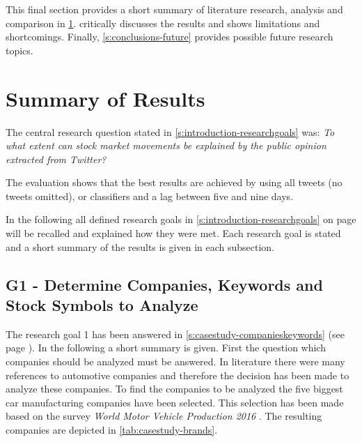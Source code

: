 This final section provides a short summary of literature research, analysis and comparison in \cref{s:conclusions-summary}.
 critically discusses the results and shows limitations and shortcomings. 
Finally, \cref{s:conclusions-future} provides possible future research topics.

\section{Summary of Results}
\label{s:conclusions-summary}

The central research question stated in \cref{s:introduction-researchgoals} was: \emph{To what extent can stock market movements be explained by the public opinion extracted from Twitter?}

The evaluation shows that the best results are achieved by using all tweets (no tweets omitted), \svm{} or \nb{} classifiers and a lag between five and nine days.

In the following all defined research goals in \cref{s:introduction-researchgoals} on page \pageref{s:introduction-researchgoals} will be recalled and explained how they were met.
Each research goal is stated and a short summary of the results is given in each subsection.


\subsection{G1 - Determine Companies, Keywords and Stock Symbols to Analyze}
\label{ss:conclusion-summary-g1}


The research goal 1 has been answered in \cref{s:casestudy-companieskeywords} (see page \pageref{s:casestudy-companieskeywords}).
In the following a short summary is given.
First the question which companies should be analyzed must be answered.
In literature there were many references to automotive companies and therefore the decision has been made to analyze these companies.
To find the companies to be analyzed the five biggest car manufacturing companies have been selected.
This selection has been made based on the survey \emph{World Motor Vehicle Production 2016} \citep{OICA2016}. 
The resulting companies are depicted in \cref{tab:casestudy-brands}.

